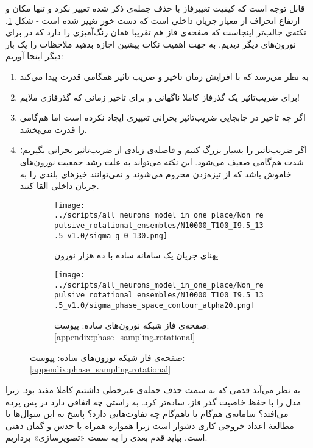 قابل توجه است که کیفیت تغییرفاز با حذف جمله‌ی ذکر شده تغییر نکرد و تنها مکان و ارتفاع انحراف از معیار جریان داخلی است که دست خور تغییر شده است - شکل \ref{fig:sigma_non_repulsive}. نکته‌ی جالب‌تر اینجاست که صفحه‌ی فاز هم تقریبا همان رنگ‌آمیزی را دارد که در برای نورون‌های دیگر دیدیم. به جهت اهمیت نکات پیشین اجازه بدهید ملاحظات را یک بار دیگر اینجا آوریم:\\

\begin{enumerate}[1.]
	\item 
	به نظر می‌رسد که با افزایش زمان تاخیر و ضریب تاثیر همگامی قدرت پیدا می‌کند
	\item 
	برای ضریب‌تاثیر یک گذرفاز کاملا ناگهانی و برای تاخیر زمانی که گذرفازی ملایم!
	\item 
	اگر چه تاخیر در جابجایی ضریب‌تاثیر بحرانی تغییری ایجاد نکرده است اما هم‌گامی را قدرت می‌بخشد.
	\item
	اگر ضریب‌تاثیر را بسیار بزرگ کنیم و فاصله‌ی زیادی از ضریب‌تاثیر بحرانی بگیریم؛ شدت هم‌گامی ضعیف می‌شود. این نکته می‌تواند به علت رشد جمعیت نورون‌های خاموش باشد که از تیزه‌زدن محروم می‌شوند و نمی‌توانند خیزهای بلندی را به جریان داخلی القا کنند.
\end{enumerate}



\begin{figure}
	\begin{subfigure}{0.5\textwidth}
		\centering
		\texttt{[image: ../scripts/all\_neurons\_model\_in\_one\_place/Non\_repulsive\_rotational\_ensembles/N10000\_T100\_I9.5\_13.5\_v1.0/sigma\_g\_0\_130.png]}
		\caption{پهنای جریان یک سامانه ساده با ده هزار نورون}
		\label{fig:sigma_non_repulsive}
	\end{subfigure}
	\hfill
	\begin{subfigure}{0.5\textwidth}
		\texttt{[image: ../scripts/all\_neurons\_model\_in\_one\_place/Non\_repulsive\_rotational\_ensembles/N10000\_T100\_I9.5\_13.5\_v1.0/sigma\_phase\_space\_contour\_alpha20.png]}
		\caption{
			صفحه‌ی فاز شبکه نورون‌های ساده: پیوست:
			\ref{appendix:phase_samplingـrotational}
		}
		\label{fig:if_g_d_phase_space_Non_repulsive}
	\end{subfigure}
\end{figure}

به نظر می‌آید قدمی که به سمت حذف جمله‌ی غیرخطی داشتیم کاملا مفید بود. زیرا مدل را با حفظ خاصیت گذر فاز، ساده‌تر کرد.  به راستی چه اتفاقی دارد در پس پرده می‌افتد؟ سامانه‌ی هم‌گام با ناهم‌گام چه تفاوت‌هایی دارد؟ پاسخ به این سوال‌ها با مطالعهٔ اعداد خروجی کاری دشوار است زیرا همواره همراه با حدس و گمان ذهنی است. بیاید قدم بعدی را به سمت «تصویرسازی» برداریم.
